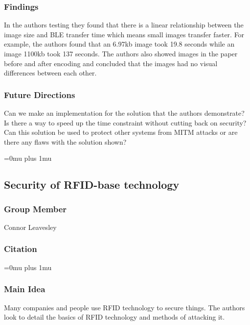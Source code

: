 \subsubsection{Findings}

\noindent
In the authors testing they found that there is a linear relationship between the image size and BLE transfer time which means small images transfer faster. For example, the authors found that an 6.97kb image took 19.8 seconds while an image 1100kb took 137 seconds. The authors also showed images in the paper before and after encoding and concluded that the images had no visual differences between each other.

\subsubsection{Future Directions}

\noindent
Can we make an implementation for the solution that the authors demonstrate? Is there a way to speed up the time constraint without cutting back on security? Can this solution be used to protect other systems from MITM attacks or are there any flaws with the solution shown?

\Urlmuskip=0mu plus 1mu\relax


\noindent
\subsection{Security of RFID-base technology}

\subsubsection{Group Member}

\noindent
Connor Leavesley

\noindent
\subsubsection{Citation}

\Urlmuskip=0mu plus 1mu\relax

\subsubsection{Main Idea}

\noindent
Many companies and people use RFID technology to secure things. The authors look to detail the basics of RFID technology and methods of attacking it. 

